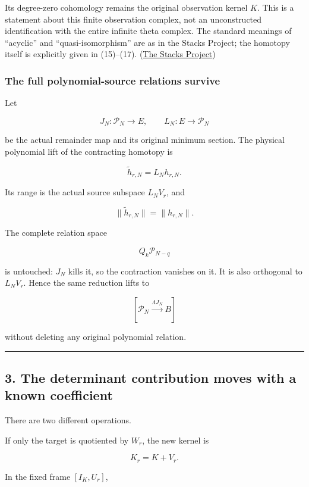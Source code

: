 \documentclass[11pt]{article}
\begin{document}
Its degree-zero cohomology remains the original observation kernel \(K\). This is a statement about this finite observation complex, not an unconstructed identification with the entire infinite theta complex. The standard meanings of ``acyclic'' and ``quasi-isomorphism'' are as in the Stacks Project; the homotopy itself is explicitly given in (15)--(17). (\href{https://stacks.math.columbia.edu/tag/0115}{The Stacks Project})

\subsubsection{The full polynomial-source relations survive}\label{the-full-polynomial-source-relations-survive}

Let

\[
J_N:\mathcal P_N\to E,\qquad L_N:E\to\mathcal P_N
\]

be the actual remainder map and its original minimum section. The physical polynomial lift of the contracting homotopy is

\[
\widetilde h_{r,N}=L_Nh_{r,N}.
\]

Its range is the actual source subspace \(L_NV_r\), and

\[
\|\widetilde h_{r,N}\|=\|h_{r,N}\|.
\]

The complete relation space

\[
Q_k\mathcal P_{N-q}
\]

is untouched: \(J_N\) kills it, so the contraction vanishes on it. It is also orthogonal to \(L_NV_r\). Hence the same reduction lifts to

\[
[\mathcal P_N\xrightarrow{\Lambda J_N}B]
\]

without deleting any original polynomial relation.

\begin{center}\rule{0.5\linewidth}{0.5pt}\end{center}

\subsection{3. The determinant contribution moves with a known coefficient}\label{the-determinant-contribution-moves-with-a-known-coefficient}

There are two different operations.

If only the target is quotiented by \(W_r\), the new kernel is

\[
K_r=K+V_r.
\]

In the fixed frame \([I_K,U_r]\),
\end{document}
